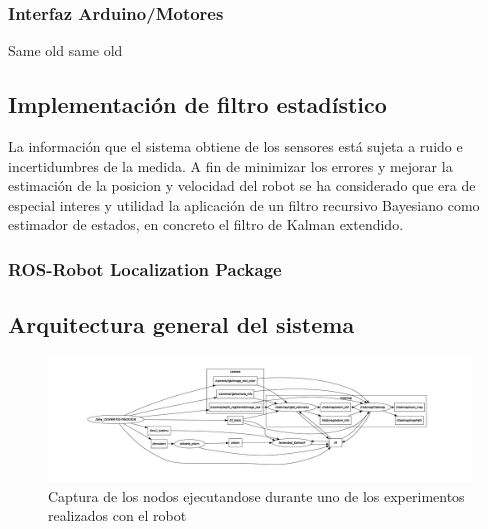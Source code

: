 \subsubsection{Interfaz Arduino/Motores}
Same old same old
\subsection{Implementación de filtro estadístico}
La información que el sistema obtiene de los sensores está sujeta a ruido e incertidumbres de la medida. A fin de minimizar los errores y mejorar la estimación de la posicion y velocidad del robot se ha 
considerado que era de especial interes y utilidad la aplicación de un filtro recursivo Bayesiano como estimador de estados, en concreto el filtro de Kalman extendido.
\subsubsection{ROS-Robot Localization Package}

\subsection{Arquitectura general del sistema}
\begin{figure}[!ht]
    \centering
    \includegraphics[width=\textwidth]{images/rqt_graphs/graph_RTABMAP.pdf}
    \caption{Captura de los nodos ejecutandose durante uno de los experimentos realizados con el robot}
    \label{rqt01}
\end{figure}
